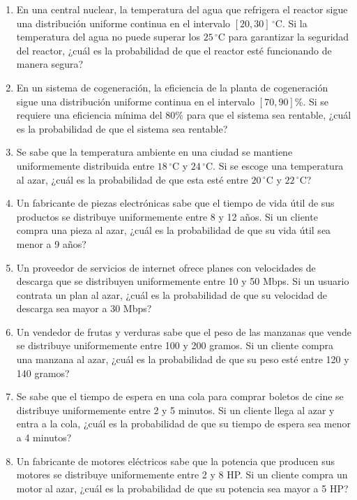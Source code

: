 \begin{Ejer}
\begin{enumerate}
    \item En una central nuclear, la temperatura del agua que refrigera el reactor sigue una distribución uniforme continua en el intervalo $[20, 30]\,^\circ$C. Si la temperatura del agua no puede superar los $25\,^\circ$C para garantizar la seguridad del reactor, ¿cuál es la probabilidad de que el reactor esté funcionando de manera segura?

    \item En un sistema de cogeneración, la eficiencia de la planta de cogeneración sigue una distribución uniforme continua en el intervalo $[70, 90]$\%. Si se requiere una eficiencia mínima del 80\% para que el sistema sea rentable, ¿cuál es la probabilidad de que el sistema sea rentable?

    \item Se sabe que la temperatura ambiente en una ciudad se mantiene uniformemente distribuida entre $18\,^\circ$C y $24\,^\circ$C. Si se escoge una temperatura al azar, ¿cuál es la probabilidad de que esta esté entre $20\,^\circ$C y $22\,^\circ$C?

    \item Un fabricante de piezas electrónicas sabe que el tiempo de vida útil de sus productos se distribuye uniformemente entre 8 y 12 años. Si un cliente compra una pieza al azar, ¿cuál es la probabilidad de que su vida útil sea menor a 9 años?

    \item Un proveedor de servicios de internet ofrece planes con velocidades de descarga que se distribuyen uniformemente entre 10 y 50 Mbps. Si un usuario contrata un plan al azar, ¿cuál es la probabilidad de que su velocidad de descarga sea mayor a 30 Mbps?

    \item Un vendedor de frutas y verduras sabe que el peso de las manzanas que vende se distribuye uniformemente entre 100 y 200 gramos. Si un cliente compra una manzana al azar, ¿cuál es la probabilidad de que su peso esté entre 120 y 140 gramos?

    \item Se sabe que el tiempo de espera en una cola para comprar boletos de cine se distribuye uniformemente entre 2 y 5 minutos. Si un cliente llega al azar y entra a la cola, ¿cuál es la probabilidad de que su tiempo de espera sea menor a 4 minutos?

    \item Un fabricante de motores eléctricos sabe que la potencia que producen sus motores se distribuye uniformemente entre 2 y 8 HP. Si un cliente compra un motor al azar, ¿cuál es la probabilidad de que su potencia sea mayor a 5 HP?


\end{enumerate}
\end{Ejer} 


